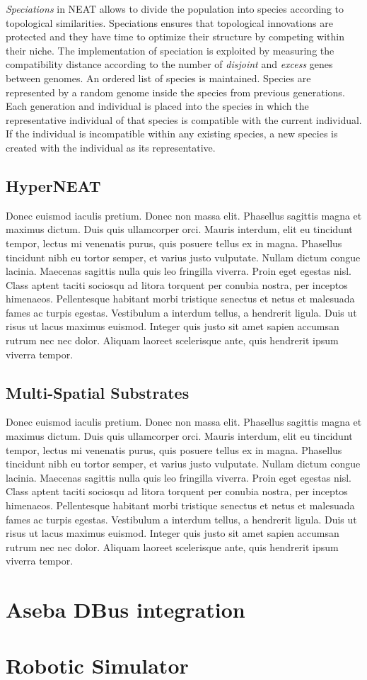 \documentclass[format=acmsmall, review=false, screen=true]{acmart}
\begin{document}
\emph{Speciations} in NEAT allows to divide the population into species according to topological similarities. Speciations ensures that topological innovations are protected and they have time to optimize their structure by competing within their niche. The implementation of speciation is exploited by measuring the compatibility distance according to the number of \emph{disjoint} and \emph{excess} genes between genomes. An ordered list of species is maintained. Species are represented by a random genome inside the species from previous generations. Each generation and individual is placed into the species in which the representative individual of that species is compatible with the current individual. If the individual is incompatible within any existing species, a new species is created with the individual as its representative. 


\subsection{HyperNEAT}

Donec euismod iaculis pretium. Donec non massa elit. Phasellus sagittis magna et maximus dictum. Duis quis ullamcorper orci. Mauris interdum, elit eu tincidunt tempor, lectus mi venenatis purus, quis posuere tellus ex in magna. Phasellus tincidunt nibh eu tortor semper, et varius justo vulputate. Nullam dictum congue lacinia. Maecenas sagittis nulla quis leo fringilla viverra. Proin eget egestas nisl. Class aptent taciti sociosqu ad litora torquent per conubia nostra, per inceptos himenaeos. Pellentesque habitant morbi tristique senectus et netus et malesuada fames ac turpis egestas. Vestibulum a interdum tellus, a hendrerit ligula. Duis ut risus ut lacus maximus euismod. Integer quis justo sit amet sapien accumsan rutrum nec nec dolor. Aliquam laoreet scelerisque ante, quis hendrerit ipsum viverra tempor.

\subsection{Multi-Spatial Substrates}

Donec euismod iaculis pretium. Donec non massa elit. Phasellus sagittis magna et maximus dictum. Duis quis ullamcorper orci. Mauris interdum, elit eu tincidunt tempor, lectus mi venenatis purus, quis posuere tellus ex in magna. Phasellus tincidunt nibh eu tortor semper, et varius justo vulputate. Nullam dictum congue lacinia. Maecenas sagittis nulla quis leo fringilla viverra. Proin eget egestas nisl. Class aptent taciti sociosqu ad litora torquent per conubia nostra, per inceptos himenaeos. Pellentesque habitant morbi tristique senectus et netus et malesuada fames ac turpis egestas. Vestibulum a interdum tellus, a hendrerit ligula. Duis ut risus ut lacus maximus euismod. Integer quis justo sit amet sapien accumsan rutrum nec nec dolor. Aliquam laoreet scelerisque ante, quis hendrerit ipsum viverra tempor.

\section{Aseba DBus integration}

\section{Robotic Simulator}
\end{document}
